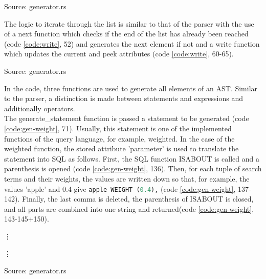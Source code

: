 \begin{codeenv}
    \label{code:gen-struct}
    
    \centerline{Source: generator.rs}
\end{codeenv}
The logic to iterate through the list is similar to that of the parser with the use of a next function which checks if the end of the list has already been reached (code \ref{code:write}, 52) and generates the next element if not and a write function which updates the current and peek attributes (code \ref{code:write}, 60-65).
\begin{codeenv}
    \label{code:write}
    
    \centerline{Source: generator.rs}
\end{codeenv}
In the code, three functions are used to generate all elements of an \ac{AST}. Similar to the parser, a distinction is made between statements and expressions and additionally operators.\\
The generate\_statement function is passed a statement to be generated (code \ref{code:gen-weight}, 71). Usually, this statement is one of the implemented functions of the query language, for example, weighted. In the case of the weighted function, the stored attribute 'parameter' is used to translate the statement into \ac{SQL} as follows. First, the \ac{SQL} function ISABOUT is called and a parenthesis is opened (code \ref{code:gen-weight}, 136). Then, for each tuple of search terms and their weights, the values are written down so that, for example, the values 'apple' and 0.4 give \lstinline[language=SQL]$apple WEIGHT (0.4),$ (code \ref{code:gen-weight}, 137-142). Finally, the last comma is deleted, the parenthesis of ISABOUT is closed, and all parts are combined into one string and returned(code \ref{code:gen-weight}, 143-145+150).
\begin{codeenv}
    \label{code:gen-weight}
    
    \vdots
    
    \vdots
    
    \centerline{Source: generator.rs}
\end{codeenv}